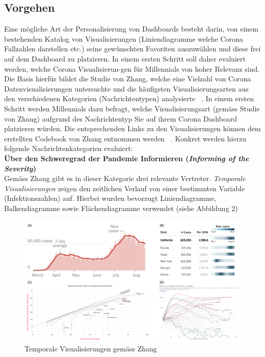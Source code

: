 \documentclass[12pt, oneside]{article}
\begin{document}
\clearpage
\subsection{Vorgehen}
Eine mögliche Art der Personalisierung von Dashboards besteht darin, von einem bestehenden Katalog von Visualisierungen (Liniendiagramme welche Corona Fallzahlen darstellen etc.) seine gewünschten Favoriten auszuwählen und diese frei auf dem Dashboard zu platzieren. In einem ersten Schritt soll daher evaluiert werden, welche Corona Visualisierun-gen für Millennials von hoher Relevanz sind. Die Basis hierfür bildet die Studie von Zhang, welche eine Vielzahl von Corona Datenvisualisierungen untersuchte und die häufigsten Visualisierungsarten aus den verschiedenen Kategorien (Nachrichtentypen) analysierte ~\citep{YixuanZhang.}. In einem ersten Schritt werden Millennials dazu befragt, welche Visualisierungsart (gemäss Studie von Zhang) aufgrund des Nachrichtentyp Sie auf ihrem Corona Dashboard platzieren würden. Die entsprechenden Links zu den Visualisierungen können dem erstellten Codebook von Zhang entnommen werden ~\citep{YixuanZhang.2021}. Konkret werden hierzu folgende Nachrichtenkategorien evaluiert:\\

\textbf{Über den Schweregrad der Pandemie Informieren (\textit{Informing of the Severity})}\\
Gemäss Zhang gibt es in dieser Kategorie drei relevante Vertreter. \textit{Temporale Visualisierungen} zeigen den zeitlichen Verlauf von einer bestimmten Variable (Infektionszahlen) auf. Hierbei wurden bevorzugt Liniendiagramme, Balkendiagramme sowie Flächendiagramme verwendet (siehe Abbildung 2)
\begin{figure}[ht]
	\includegraphics[width=12cm]{images/temporal_visualizations.png}
	\centering
	\caption{Temporale Visualisierungen gemäss Zhang ~\citep[S. 7]{YixuanZhang.}}
\end{figure}
\end{document}
